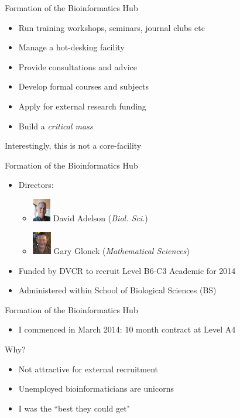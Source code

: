 \documentclass[11pt]{beamer}
\begin{document}
\begin{frame}{Formation of the Bioinformatics Hub}

	\begin{itemize}
		\item Run training workshops, seminars, journal clubs etc
		\item Manage a hot-desking facility
		\item Provide consultations and advice
		\item Develop formal courses and subjects
		\item Apply for external research funding
		\item Build a \textit{critical mass}
	\end{itemize}
	
	\pause
	Interestingly, this is not a core-facility\\[5mm]

\end{frame}

\begin{frame}{Formation of the Bioinformatics Hub}

	\begin{itemize}
		\item Directors: 
		\begin{itemize}
			\item \includegraphics[height=1cm]{figures/dave.jpg} David Adelson (\textit{Biol. Sci.})
			\item \includegraphics[height=1cm]{figures/gary.jpg} Gary Glonek (\textit{Mathematical Sciences})
		\end{itemize}			
		\item Funded by DVCR to recruit Level B6-C3 Academic for 2014 
		\item Administered within School of Biological Sciences (BS)\\[1cm]

	\end{itemize}	
	
\end{frame}

\begin{frame}{Formation of the Bioinformatics Hub}
	
	\begin{itemize}
		\item I commenced in March 2014: 10 month contract at Level A4
	\end{itemize}
	Why?
	\pause
	\begin{itemize}
		\item Not attractive for external recruitment
		\item Unemployed bioinformaticians are unicorns
		\item I was the ``best they could get"\\[2cm]
	\end{itemize}
	
\end{frame}
\end{document}
